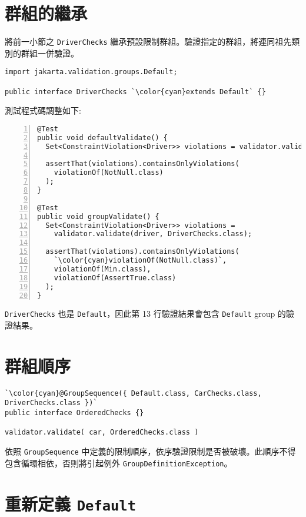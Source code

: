 \section{群組的繼承}

將前一小節之 \texttt{DriverChecks} 繼承預設限制群組。驗證指定的群組，將連同祖先類別的群組一併驗證。

\begin{lstlisting}
import jakarta.validation.groups.Default;

public interface DriverChecks `\color{cyan}extends Default` {}
\end{lstlisting}

測試程式碼調整如下:

\begin{lstlisting}[numbers=left, xleftmargin=1.5\parindent]
@Test
public void defaultValidate() {
  Set<ConstraintViolation<Driver>> violations = validator.validate(driver);

  assertThat(violations).containsOnlyViolations(
    violationOf(NotNull.class)
  );
}

@Test
public void groupValidate() {
  Set<ConstraintViolation<Driver>> violations =
    validator.validate(driver, DriverChecks.class);

  assertThat(violations).containsOnlyViolations(
    `\color{cyan}violationOf(NotNull.class)`,
    violationOf(Min.class),
    violationOf(AssertTrue.class)
  );
}
\end{lstlisting}

\texttt{DriverChecks} 也是 \texttt{Default}，因此第 13 行驗證結果會包含 \texttt{Default} group 的驗證結果。

\section{群組順序}

\begin{lstlisting}
`\color{cyan}@GroupSequence({ Default.class, CarChecks.class, DriverChecks.class })`
public interface OrderedChecks {}

validator.validate( car, OrderedChecks.class )
\end{lstlisting}

依照 \texttt{GroupSequence} 中定義的限制順序，依序驗證限制是否被破壞。此順序不得包含循環相依，否則將引起例外 \texttt{GroupDefinitionException}。

\section{重新定義 \texttt{Default}}

